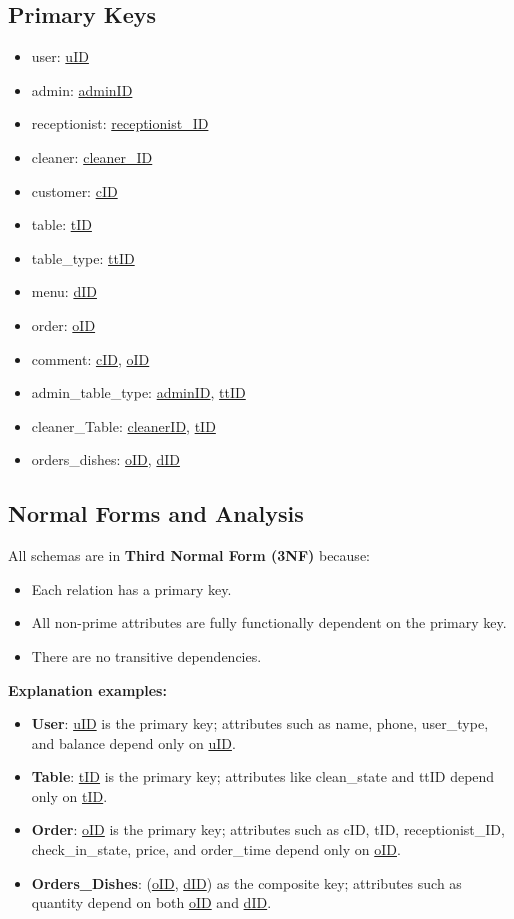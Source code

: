 \documentclass[12pt]{article}
\begin{document}
\subsection{Primary Keys}
\begin{itemize}
    \item user: \underline{uID}
    \item admin: \underline{adminID}
    \item receptionist: \underline{receptionist\_ID}
    \item cleaner: \underline{cleaner\_ID}
    \item customer: \underline{cID}
    \item table: \underline{tID}
    \item table\_type: \underline{ttID}
    \item menu: \underline{dID}
    \item order: \underline{oID}
    \item comment: \underline{cID}, \underline{oID}
    \item admin\_table\_type: \underline{adminID}, \underline{ttID}
    \item cleaner\_Table: \underline{cleanerID}, \underline{tID}
    \item orders\_dishes: \underline{oID}, \underline{dID}
\end{itemize}

\subsection{Normal Forms and Analysis}

All schemas are in \textbf{Third Normal Form (3NF)} because:
\begin{itemize}
    \item Each relation has a primary key.
    \item All non-prime attributes are fully functionally dependent on the primary key.
    \item There are no transitive dependencies.
\end{itemize}

\textbf{Explanation examples:}
\begin{itemize}
    \item \textbf{User}: \underline{uID} is the primary key; attributes such as name, phone, user\_type, and balance depend only on \underline{uID}.
    \item \textbf{Table}: \underline{tID} is the primary key; attributes like clean\_state and ttID depend only on \underline{tID}.
    \item \textbf{Order}: \underline{oID} is the primary key; attributes such as cID, tID, receptionist\_ID, check\_in\_state, price, and order\_time depend only on \underline{oID}.
    \item \textbf{Orders\_Dishes}: (\underline{oID}, \underline{dID}) as the composite key; attributes such as quantity depend on both \underline{oID} and \underline{dID}.
\end{itemize}
\end{document}
